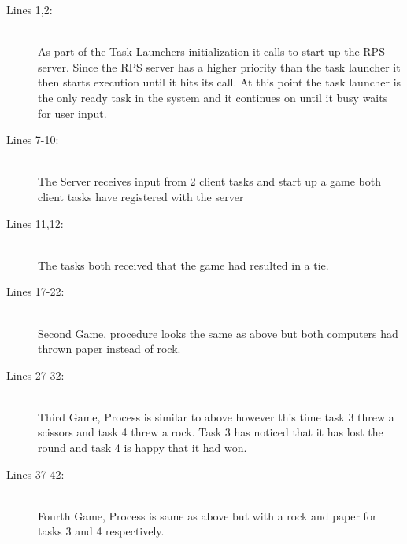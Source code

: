 \documentclass[pdftex,10pt,a4paper]{article}
\begin{document}
\begin{description}
\item[Lines 1,2:] \hfill \\
As part of the Task Launchers initialization it calls  to
start up the RPS server. Since the RPS server has a higher priority
than the task launcher it then starts execution until it hits its
 call. At this point the task launcher is the only
ready task in the system and it continues on until it busy waits for
user input.

\item[Lines 7-10:] \hfill \\
The Server receives input from 2 client tasks and start up a game
both client tasks have registered with the server

\item[Lines 11,12:] \hfill \\
The tasks both received that the game had resulted in a tie.

\item[Lines 17-22:] \hfill \\
Second Game, procedure looks the same as above but both computers had thrown paper
instead of rock.

\item[Lines 27-32:] \hfill \\
Third Game, Process is similar to above however this time task 3 threw a scissors
and task 4 threw a rock. Task 3 has noticed that it has lost the round and task 4
is happy that it had won.

\item[Lines 37-42:] \hfill \\
Fourth Game, Process is same as above but with a rock and paper for tasks 3 and 4
respectively.
\end{description}
\end{document}
